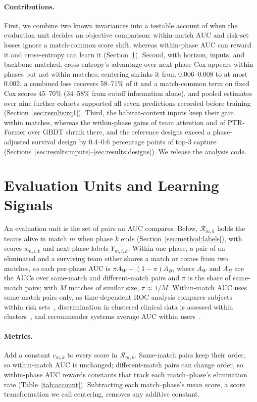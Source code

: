 \documentclass[sigconf,anonymous,nonacm]{acmart}
\begin{document}
\paragraph{Contributions.}
First, we combine two known invariances into a testable account of when the evaluation unit decides an objective comparison: within-match AUC and risk-set losses ignore a match-common score shift, whereas within-phase AUC can reward it and cross-entropy can learn it (Section~\ref{sec:account}). Second, with horizon, inputs, and backbone matched, cross-entropy's advantage over next-phase Cox appears within phases but not within matches; centering shrinks it from 0.006--0.008 to at most 0.002, a combined loss recovers 58--71\% of it and a match-common term on fixed Cox scores 45--70\% (34--58\% from cutoff information alone), and pooled estimates over nine further cohorts supported all seven predictions recorded before training (Section~\ref{sec:results:rq1}). Third, the habitat-context inputs keep their gain within matches, whereas the within-phase gains of team attention and of PTR-Former over GBDT shrink there, and the reference designs exceed a phase-adjusted survival design by 0.4--0.6 percentage points of top-3 capture (Sections~\ref{sec:results:inputs}--\ref{sec:results:designs}). We release the analysis code.

\section{Evaluation Units and Learning Signals}
\label{sec:account}
An evaluation unit is the set of pairs an AUC compares. Below, $\mathcal{R}_{m,k}$ holds the teams alive in match $m$ when phase $k$ ends (Section~\ref{sec:method:labels}), with scores $s_{m,i,k}$ and next-phase labels $Y_{m,i,k}$. Within one phase, a pair of an eliminated and a surviving team either shares a match or comes from two matches, so each per-phase AUC is $\pi A_W+(1-\pi)A_B$, where $A_W$ and $A_B$ are the AUCs over same-match and different-match pairs and $\pi$ is the share of same-match pairs; with $M$ matches of similar size, $\pi\approx1/M$. Within-match AUC uses same-match pairs only, as time-dependent ROC analysis compares subjects within risk sets~\cite{HeagertyZheng05}, discrimination in clustered clinical data is assessed within clusters~\cite{vanKlaveren14}, and recommender systems average AUC within users~\cite{Zhou18}.

\paragraph{Metrics.}
Add a constant $c_{m,k}$ to every score in $\mathcal{R}_{m,k}$. Same-match pairs keep their order, so within-match AUC is unchanged; different-match pairs can change order, so within-phase AUC rewards constants that track each match--phase's elimination rate (Table~\ref{tab:account}). Subtracting each match--phase's mean score, a score transformation we call centering, removes any additive constant.
\end{document}
